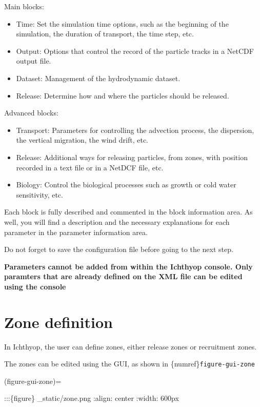 \documentclass[
  letterpaper,
  DIV=11,
  numbers=noendperiod]{scrreprt}
\providecommand{\tightlist}{%
  \setlength{\itemsep}{0pt}\setlength{\parskip}{0pt}}\usepackage{longtable,booktabs,array}
\begin{document}
Main blocks:

\begin{itemize}
\tightlist
\item
  Time: Set the simulation time options, such as the beginning of the
  simulation, the duration of transport, the time step, etc.
\item
  Output: Options that control the record of the particle tracks in a
  NetCDF output file.
\item
  Dataset: Management of the hydrodynamic dataset.
\item
  Release: Determine how and where the particles should be released.
\end{itemize}

Advanced blocks:

\begin{itemize}
\tightlist
\item
  Transport: Parameters for controlling the advection process, the
  dispersion, the vertical migration, the wind drift, etc.
\item
  Release: Additional ways for releasing particles, from zones, with
  position recorded in a text file or in a NetDCF file, etc.
\item
  Biology: Control the biological processes such as growth or cold water
  sensitivity, etc.
\end{itemize}

Each block is fully described and commented in the block information
area. As well, you will find a description and the necessary
explanations for each parameter in the parameter information area.

Do not forget to save the configuration file before going to the next
step.

\textbf{Parameters cannot be added from within the Ichthyop console.
Only paramters that are already defined on the XML file can be edited
using the console}

\section{Zone definition}\label{zone-definition}

In Ichthyop, the user can define zones, either release zones or
recruitment zones.

The zones can be edited using the GUI, as shown in
\{numref\}\texttt{figure-gui-zone}

(figure-gui-zone)=

:::\{figure\} \_static/zone.png :align: center :width: 600px
\end{document}
